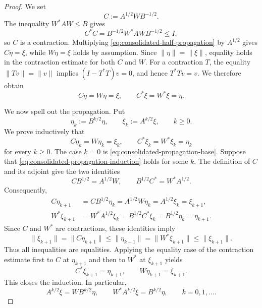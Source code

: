 \documentclass[11pt]{article}
\theoremstyle{remark}
\newcommand{\1}{\mathbbm{1}}
\begin{document}
\begin{proof}
We set
\begin{equation}
 C:=A^{1/2}WB^{-1/2}.
\end{equation}
The inequality $W^*AW\leq B$ gives
\begin{equation}
 C^*C
 =B^{-1/2}W^*AWB^{-1/2}\leq I,
\end{equation}
so $C$ is a contraction.  Multiplying
\eqref{eq:consolidated-half-propagation} by $A^{1/2}$ gives
$C\eta=\xi$, while $W\eta=\xi$ holds by assumption.  Since
$\|\eta\|=\|\xi\|$, equality holds in the contraction estimate for
both $C$ and $W$.  For a contraction $T$, the equality
$\|Tv\|=\|v\|$ implies
$(I-T^*T)v=0$, and hence $T^*Tv=v$.  We therefore obtain
\begin{equation}
 C\eta=W\eta=\xi,
 \qquad
 C^*\xi=W^*\xi=\eta.
 \label{eq:consolidated-propagation-base}
\end{equation}

We now spell out the propagation.  Put
\begin{equation}
 \eta_k:=B^{k/2}\eta,
 \qquad
 \xi_k:=A^{k/2}\xi,
 \qquad k\geq0.
\end{equation}
We prove inductively that
\begin{equation}
 C\eta_k=W\eta_k=\xi_k,
 \qquad
 C^*\xi_k=W^*\xi_k=\eta_k
 \label{eq:consolidated-propagation-induction}
\end{equation}
for every $k\geq0$.  The case $k=0$ is
\eqref{eq:consolidated-propagation-base}.  Suppose that
\eqref{eq:consolidated-propagation-induction} holds for some $k$.
The definition of $C$ and its adjoint give the two identities
\begin{equation}
 CB^{1/2}=A^{1/2}W,
 \qquad
 B^{1/2}C^*=W^*A^{1/2}.
 \label{eq:consolidated-C-shift-identities}
\end{equation}
Consequently,
\begin{align}
 C\eta_{k+1}
 &=CB^{1/2}\eta_k
   =A^{1/2}W\eta_k
   =A^{1/2}\xi_k
   =\xi_{k+1},
 \label{eq:consolidated-C-forward-step}\\
 W^*\xi_{k+1}
 &=W^*A^{1/2}\xi_k
   =B^{1/2}C^*\xi_k
   =B^{1/2}\eta_k
   =\eta_{k+1}.
 \label{eq:consolidated-W-adjoint-step}
\end{align}
Since $C$ and $W^*$ are contractions, these identities imply
\begin{equation}
 \|\xi_{k+1}\|
 =\|C\eta_{k+1}\|
 \leq\|\eta_{k+1}\|
 =\|W^*\xi_{k+1}\|
 \leq\|\xi_{k+1}\|.
\end{equation}
Thus all inequalities are equalities.  Applying the equality case of
the contraction estimate first to $C$ at $\eta_{k+1}$ and then to
$W^*$ at $\xi_{k+1}$ yields
\begin{equation}
 C^*\xi_{k+1}=\eta_{k+1},
 \qquad
 W\eta_{k+1}=\xi_{k+1}.
\end{equation}
This closes the induction.  In particular,
\begin{equation}
 A^{k/2}\xi=WB^{k/2}\eta,
 \qquad
 W^*A^{k/2}\xi=B^{k/2}\eta,
 \qquad k=0,1,\ldots .
 \label{eq:consolidated-half-power-propagation}
\end{equation}


\end{proof}
\end{document}
